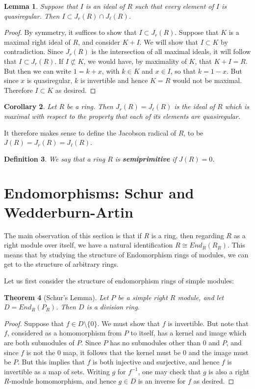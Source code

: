 \documentclass[12pt]{report}
\theoremstyle{plain}
\newtheorem{thm}{Theorem}[section]
\newtheorem{defn}[thm]{Definition}
\newtheorem{lem}[thm]{Lemma}
\newtheorem{cor}[thm]{Corollary}
\begin{document}
\begin{lem}
Suppose that $I$ is an ideal of $R$ such that every element of $I$ is
quasiregular. Then $I \subset J_r(R) \cap J_\ell(R)$.
\end{lem}
\begin{proof}
By symmetry, it suffices to show that $I \subset J_r(R)$.
Suppose that $K$ is a maximal right ideal of $R$, and consider $K + I$. We
will show that $I \subset K$ by contradiction. Since $J_r(R)$ is the
intersection of all maximal ideals, it will follow that $I \subset J_r(R)$.
If $I \not\subset K$, we would have, by maximality of $K$, that 
$K + I = R$. But then we can write $1 = k + x$, with $k \in K$ and $x \in I$, so
that $k = 1 - x$. But since $x$ is quasiregular, $k$ is invertible and
hence $K = R$ would not be maximal. Therefore $I \subset K$ as desired.
\end{proof}

\begin{cor}
Let $R$ be a ring. Then $J_r(R) = J_\ell(R)$ is the ideal of $R$ which is
maximal with respect to the property that each of its elements are
quasiregular.
\end{cor}

It therefore makes sense to define the Jacobson radical of $R$, to be $J(R)
= J_r(R) = J_\ell(R)$.

\begin{defn}
We say that a ring $R$ is \textbf{semiprimitive} if $J(R) = 0$.
\end{defn}

\section{Endomorphisms: Schur and Wedderburn-Artin}

The main observation of this section is that if $R$ is a ring, then
regarding $R$ as a right module over itself, we have a natural
identification $R \cong End_R(R_R)$. This means that by studying the
structure of Endomorphism rings of modules, we can get to the structure of
arbitrary rings.

Let us first consider the structure of endomorphism rings of simple
modules:
\begin{thm}[Schur's Lemma]
Let $P$ be a simple right $R$ module, and let $D = End_R(P_R)$. Then $D$ is
a division ring.
\end{thm}
\begin{proof}
Suppose that $f \in D \setminus \{0\}$. We must show that $f$ is invertible.
But note that $f$, considered as a homomorphism from $P$ to itself, has a
kernel and image which are both submodules of $P$. Since $P$ has no
submodules other than $0$ and $P$, and since $f$ is not the $0$ map, it
follows that the kernel must be $0$ and the image must be $P$. But this
implies that $f$ is both injective and surjective, and hence $f$ is
invertible as a map of sets. Writing $g$ for $f^{-1}$, one may check that
$g$ is also a right $R$-module homomorphism, and hence $g \in D$ is an
inverse for $f$ as desired.
\end{proof}
\end{document}
